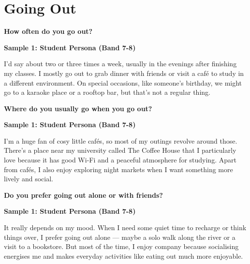 \newpage

\section{Going Out}
\begin{ieltsquestion}
\textbf{How often do you go out?}
\end{ieltsquestion}
\textbf{Sample 1: Student Persona (Band 7-8)}

I'd say about two or three times a week, usually in the evenings after finishing my classes. I mostly go out to grab dinner with friends or visit a café to study in a different environment. On special occasions, like someone's birthday, we might go to a karaoke place or a rooftop bar, but that's not a regular thing.

\separator

\begin{ieltsquestion}
\textbf{Where do you usually go when you go out?}
\end{ieltsquestion}
\textbf{Sample 1: Student Persona (Band 7-8)}

I'm a huge fan of cosy little cafés, so most of my outings revolve around those. There's a place near my university called The Coffee House that I particularly love because it has good Wi-Fi and a peaceful atmosphere for studying. Apart from cafés, I also enjoy exploring night markets when I want something more lively and social.

\separator

\begin{ieltsquestion}
\textbf{Do you prefer going out alone or with friends?}
\end{ieltsquestion}
\textbf{Sample 1: Student Persona (Band 7-8)}

It really depends on my mood. When I need some quiet time to recharge or think things over, I prefer going out alone — maybe a solo walk along the river or a visit to a bookstore. But most of the time, I enjoy company because socialising energises me and makes everyday activities like eating out much more enjoyable.

\separator


